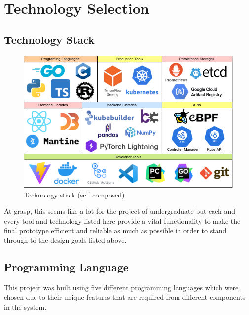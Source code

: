 \section{Technology Selection}
\subsection{Technology Stack}

\begin{figure}[H] 
    \includegraphics[width=16cm]{assets/implementation/technology-stack.png}
    \caption{Technology stack (self-composed)}
    \label{fig:technology-stack}
\end{figure}

At grasp, this seems like a lot for the project of undergraduate but each and every tool and technology listed here provide a vital functionality to make the final prototype efficient and reliable as much as possible in order to stand through to the design goals listed above.

\subsection{Programming Language}

This project was built using five different programming languages which were chosen due to their unique features that are required from different components in the system.

